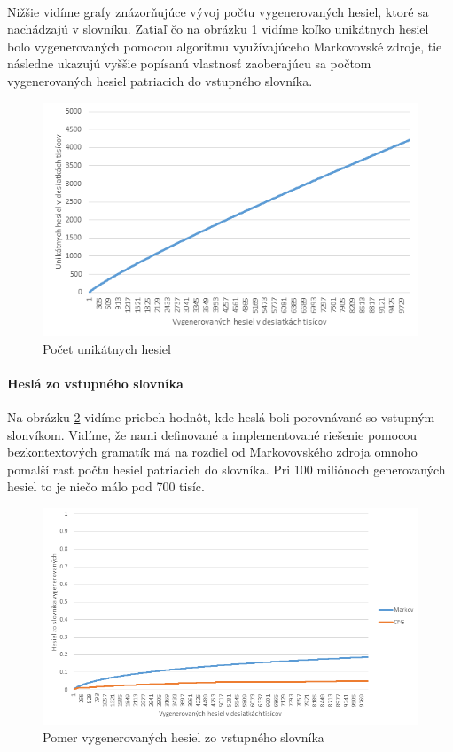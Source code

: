 \paragraph{}
Nižšie vidíme grafy znázorňujúce vývoj počtu vygenerovaných hesiel, ktoré sa nachádzajú v slovníku. Zatiaľ čo na obrázku \ref{fig:uniqMarkov} vidíme koľko unikátnych hesiel bolo vygenerovaných pomocou algoritmu využívajúceho Markovovské zdroje, tie následne ukazujú vyššie popísanú vlastnosť zaoberajúcu sa počtom vygenerovaných hesiel patriacich do vstupného slovníka.

\begin{figure}[ht]
    \centering
    \includegraphics[width=1\textwidth]{uniqMarkov}
    \caption{Počet unikátnych hesiel}
    \label{fig:uniqMarkov}
\end{figure}
\paragraph{Heslá zo vstupného slovníka}
Na obrázku \ref{fig:sameDictAcc} vidíme priebeh hodnôt, kde heslá boli porovnávané so vstupným slonvíkom. Vidíme, že nami definované a implementované riešenie pomocou bezkontextových gramatík má na rozdiel od Markovovského zdroja omnoho pomalší rast počtu hesiel patriacich do slovníka. Pri 100 miliónoch generovaných hesiel to je niečo málo pod 700 tisíc.

\begin{figure}[ht]
    \centering
    \includegraphics[width=1\textwidth]{sameDictAcc}
    \caption{Pomer vygenerovaných hesiel zo vstupného slovníka}
    \label{fig:sameDictAcc}
\end{figure}

